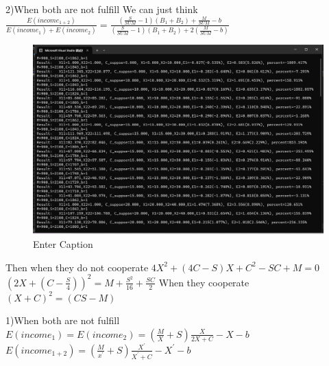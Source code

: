 \documentclass{article}
\begin{document}
\par2)When both are not fulfill
We can just think $\frac{E(income_{1+2})}{E(income_1)+E(income_2)}=\frac{(\frac{S}{SUM}-1)(B_1+B_2)+\frac{M}{SUM}-b}{(\frac{S}{SUM}-1)(B_1+B_2)+2(\frac{M}{SUM}-b)}$
\begin{figure}
    \centering
    \includegraphics[width=1\linewidth]{2.png}
    \caption{Enter Caption}
    \label{fig:enter-label}
\end{figure}
Then when they do not cooperate
 $4X^2+(4C-S)X+C^2-SC+M=0$
 $(2X+(C-\frac{S}{4}))^2=M+\frac{S^2}{16}+\frac{SC}{2}$
 When they cooperate
  $(X+C)^2=(CS-M)$
\par1)When both are not fulfill
$E(income_1)=E(income_2)=(\frac{M}{X}+S)\frac{X}{2X+C}-X-b$
$E(income_{1+2})=(\frac{M}{x^{'}}+S)\frac{X^{'}}{X^{'}+C}-X^{'}-b$
\end{document}
